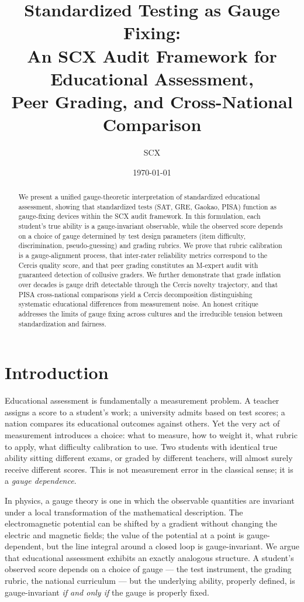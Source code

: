 \documentclass[12pt,a4paper]{article}
\title{\textbf{Standardized Testing as Gauge Fixing:\\
An SCX Audit Framework for Educational Assessment,\\
Peer Grading, and Cross-National Comparison}}
\author{SCX}
\date{\today}
\theoremstyle{remark}
\begin{document}
\maketitle

\begin{abstract}
We present a unified gauge-theoretic interpretation of standardized educational assessment, showing that standardized tests (SAT, GRE, Gaokao, PISA) function as gauge-fixing devices within the SCX audit framework. In this formulation, each student's true ability is a gauge-invariant observable, while the observed score depends on a choice of gauge determined by test design parameters (item difficulty, discrimination, pseudo-guessing) and grading rubrics. We prove that rubric calibration is a gauge-alignment process, that inter-rater reliability metrics correspond to the Cercis quality score, and that peer grading constitutes an M-expert audit with guaranteed detection of collusive graders. We further demonstrate that grade inflation over decades is gauge drift detectable through the Cercis novelty trajectory, and that PISA cross-national comparisons yield a Cercis decomposition distinguishing systematic educational differences from measurement noise. An honest critique addresses the limits of gauge fixing across cultures and the irreducible tension between standardization and fairness.
\end{abstract}

\section{Introduction}

Educational assessment is fundamentally a measurement problem. A teacher assigns a score to a student's work; a university admits based on test scores; a nation compares its educational outcomes against others. Yet the very act of measurement introduces a choice: what to measure, how to weight it, what rubric to apply, what difficulty calibration to use. Two students with identical true ability sitting different exams, or graded by different teachers, will almost surely receive different scores. This is not measurement error in the classical sense; it is a \emph{gauge dependence}.

In physics, a gauge theory is one in which the observable quantities are invariant under a local transformation of the mathematical description. The electromagnetic potential can be shifted by a gradient without changing the electric and magnetic fields; the value of the potential at a point is gauge-dependent, but the line integral around a closed loop is gauge-invariant. We argue that educational assessment exhibits an exactly analogous structure. A student's observed score depends on a choice of gauge --- the test instrument, the grading rubric, the national curriculum --- but the underlying ability, properly defined, is gauge-invariant \emph{if and only if} the gauge is properly fixed.
\end{document}
